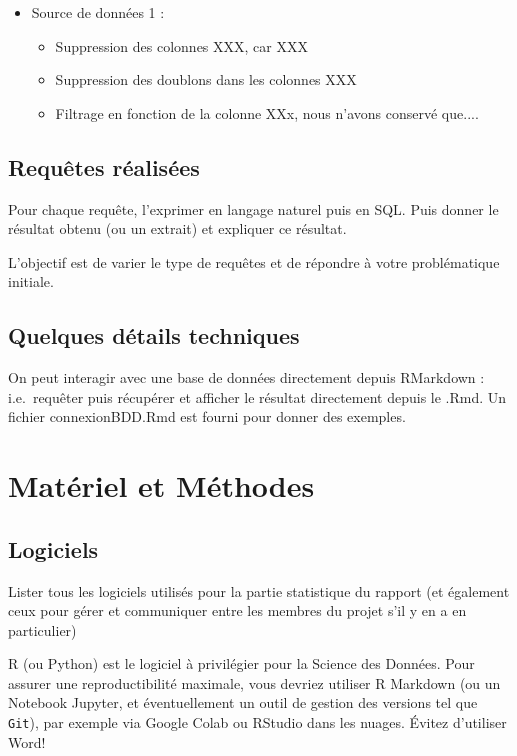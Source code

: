 \documentclass[mstat,12pt]{unswthesis}
\begin{document}
\begin{itemize}
    \item  Source de données 1 :
    \begin{itemize} 
     \item Suppression des colonnes XXX, car XXX
     \item  Suppression des doublons dans les colonnes XXX
    \item  Filtrage en fonction de la colonne XXx, nous n'avons conservé que.... 
\end{itemize}
\end{itemize}

\section{Requêtes réalisées}\label{requuxeates-ruxe9alisuxe9es}

Pour chaque requête, l'exprimer en langage naturel puis en SQL. Puis
donner le résultat obtenu (ou un extrait) et expliquer ce résultat.

L'objectif est de varier le type de requêtes et de répondre à votre
problématique initiale.

\section{Quelques détails
techniques}\label{quelques-duxe9tails-techniques-1}

On peut interagir avec une base de données directement depuis RMarkdown
: i.e.~requêter puis récupérer et afficher le résultat directement
depuis le .Rmd. Un fichier connexionBDD.Rmd est fourni pour donner des
exemples.

\chapter{Matériel et Méthodes}\label{matuxe9riel-et-muxe9thodes}

\section{Logiciels}\label{logiciels}

Lister tous les logiciels utilisés pour la partie statistique du rapport
(et également ceux pour gérer et communiquer entre les membres du projet
s'il y en a en particulier)

\medskip

R (ou Python) est le logiciel à privilégier pour la Science des Données.
Pour assurer une reproductibilité maximale, vous devriez utiliser R
Markdown (ou un Notebook Jupyter, et éventuellement un outil de gestion
des versions tel que \texttt{Git}), par exemple via Google Colab ou
RStudio dans les nuages. Évitez d'utiliser Word!
\end{document}
